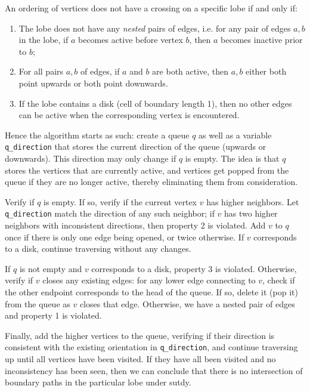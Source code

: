 \documentclass[12pt, letterpaper]{article}
\begin{document}
    An ordering of vertices does not have a crossing on a specific lobe if and only if:
    
        \begin{enumerate}
            \item The lobe does not have any \emph{nested} pairs of edges, i.e. for any pair of edges $a, b$ in the lobe,  if $a$ becomes active before vertex $b$, then $a$ becomes inactive prior to $b$;
            
            \item For all pairs $a,b$ of edges, if $a$ and $b$ are both active, then $a,b$ either both point upwards or both point downwards.
            
            \item If the lobe contains a disk (cell of boundary length 1), then no other edges can be active when the corresponding vertex is encountered.
        \end{enumerate}
        
    Hence the algorithm starts as such: create a queue $q$ as well as a variable \texttt{q\_direction} that stores the current direction of the queue (upwards or downwards). This direction may only change if $q$ is empty. The idea is that $q$ stores the vertices that are currently active, and vertices get popped from the queue if they are no longer active, thereby eliminating them from consideration.
    
    Verify if $q$ is empty. If so, verify if the current vertex $v$ has higher neighbors. Let \texttt{q\_direction} match the direction of any such neighbor; if $v$ has two higher neighbors with inconsistent directions, then property 2 is violated. Add $v$ to $q$ once if there is only one edge being opened, or twice otherwise. If $v$ corresponds to a disk, continue traversing without any changes.
    
    If $q$ is not empty and $v$ corresponds to a disk, property 3 is violated. Otherwise, verify if $v$ closes any existing edges: for any lower edge connecting to $v$, check if the other endpoint corresponds to the head of the queue. If so, delete it (pop it) from the queue as $v$ closes that edge. Otherwise, we have a nested pair of edges and property 1 is violated.
    
    Finally, add the higher vertices to the queue, verifying if their direction is consistent with the existing orientation in \texttt{q\_direction}, and continue traversing up until all vertices have been visited. If they have all been visited and no inconsistency has been seen, then we can conclude that there is no intersection of boundary paths in the particular lobe under sutdy.
    
    
    
\end{document}
